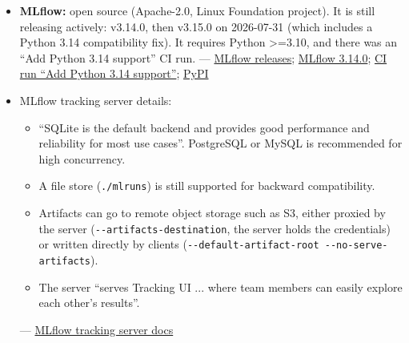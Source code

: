 \documentclass{article}
\begin{document}
\begin{itemize}
\begin{itemize}
\item \textbf{Academic:} \$0, up to 100 seats, 200 GB cloud storage. Open to ``students, professors, postdoctoral researchers at academic institutions''.

\end{itemize}

--- \href{https://coreweave.com/forge-pricing}{CoreWeave Forge pricing}

\item \textbf{MLflow:} open source (Apache-2.0, Linux Foundation project). It is still releasing actively: v3.14.0, then v3.15.0 on 2026-07-31 (which includes a Python 3.14 compatibility fix). It requires Python >=3.10, and there was an ``Add Python 3.14 support'' CI run. --- \href{https://mlflow.org/releases/}{MLflow releases}; \href{https://github.com/mlflow/mlflow/releases/tag/v3.14.0}{MLflow 3.14.0}; \href{https://github.com/mlflow/mlflow/actions/runs/18339072040}{CI run ``Add Python 3.14 support''}; \href{https://pypi.org/project/mlflow/}{PyPI}

\item MLflow tracking server details:

\begin{itemize}

\item ``SQLite is the default backend and provides good performance and reliability for most use cases''. PostgreSQL or MySQL is recommended for high concurrency.

\item A file store (\texttt{.\allowbreak{}/\allowbreak{}mlruns}) is still supported for backward compatibility.

\item Artifacts can go to remote object storage such as S3, either proxied by the server (\texttt{-\allowbreak{}-\allowbreak{}artifacts-\allowbreak{}destination}, the server holds the credentials) or written directly by clients (\texttt{-\allowbreak{}-\allowbreak{}default-\allowbreak{}artifact-\allowbreak{}root -\allowbreak{}-\allowbreak{}no-\allowbreak{}serve-\allowbreak{}artifacts}).

\item The server ``serves Tracking UI ... where team members can easily explore each other's results''.

\end{itemize}

--- \href{https://mlflow.org/docs/latest/self-hosting/architecture/tracking-server/}{MLflow tracking server docs}


\end{itemize}
\end{document}
